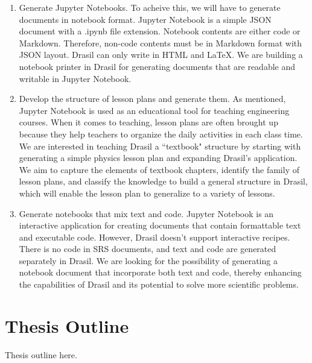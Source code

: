 \begin{enumerate}
	\item Generate Jupyter Notebooks. To acheive this, we will have 
	to generate documents in notebook format. Jupyter Notebook is a simple 
	JSON document with a .ipynb file extension. Notebook contents are either 
	code or Markdown. Therefore, non-code contents must be in Markdown format 
	with JSON layout. Drasil can only write in HTML and LaTeX. We are building 
	a notebook printer in Drasil for generating documents that are 
	readable and writable in Jupyter Notebook.
	\item Develop the structure of lesson plans and generate them. As 
	mentioned, Jupyter Notebook is used as an educational tool for teaching 
	engineering courses. When it comes to teaching, lesson plans are often 
	brought up because they help teachers to organize the daily activities 
	in each class time. We are interested in teaching Drasil a ``textbook" 
	structure by starting with generating a simple physics lesson plan and 
	expanding Drasil's application. We aim to capture the elements of 
	textbook chapters, identify the family of lesson plans, and classify the 
	knowledge to build a general structure in Drasil, which will enable the 
	lesson plan to generalize to a variety of lessons.
	\item Generate notebooks that mix text and code. Jupyter Notebook is 
	an interactive application for creating documents that contain formattable 
	text and executable code. However, Drasil doesn't support interactive 
	recipes. There is no code in SRS documents, and text and code are generated 
	separately in Drasil. We are looking for the possibility of generating a 
	notebook document that incorporate both text and code, thereby enhancing 
	the capabilities of Drasil and its potential to solve more scientific 
	problems.
\end{enumerate}

\section{Thesis Outline}
Thesis outline here.